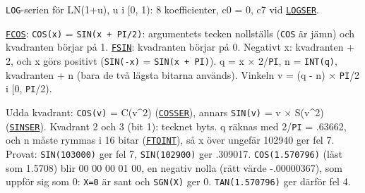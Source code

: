 \begin{Listing}
\Gap
\begin{Cmt}\par\noindent \texttt{LOG}-serien för LN(1+u), u i [0, 1): 8 koefficienter, c0 = 0, c7 vid \hyperlink{l:LOGSER}{\texttt{LOGSER}}.\par\end{Cmt}
\Gap
{}
\begin{Note}\par\noindent \hyperlink{l:FCOS}{\texttt{FCOS}}: \texttt{COS(x)} = \texttt{SIN(x + PI/2)}: argumentets tecken nollställs (\texttt{COS} är jämn) och kvadranten börjar på 1. \hyperlink{l:FSIN}{\texttt{FSIN}}: kvadranten börjar på 0. Negativt x: kvadranten + 2, och x görs positivt (\texttt{SIN(-x)} = \texttt{SIN(x + PI)}). q = {}x{} × 2/\texttt{PI}, n = \texttt{INT(q)}, kvadranten + n (bara de två lägsta bitarna används). Vinkeln v = (q - n) × \texttt{PI}/2 i [0, \texttt{PI}/2).\par
\par\noindent Udda kvadrant: \texttt{COS(v)} = C(v\^{}2) (\hyperlink{l:COSSER}{\texttt{COSSER}}), annars \texttt{SIN(v)} = v × S(v\^{}2) (\hyperlink{l:SINSER}{\texttt{SINSER}}). Kvadrant 2 och 3 (bit 1): tecknet byts. q räknas med 2/\texttt{PI} = .63662, och n måste rymmas i 16 bitar (\hyperlink{l:FTOINT}{\texttt{FTOINT}}), så {}x{} över ungefär 102940 ger fel 7. Provat: \texttt{SIN(103000)} ger fel 7, \texttt{SIN(102900)} ger .309017. \texttt{COS(1.570796)} (läst som 1.5708) blir 00 00 00 01 00, en negativ nolla (rätt värde -.00000367), som uppför sig som 0: \texttt{X=0} är sant och \texttt{SGN(X)} ger 0. \texttt{TAN(1.570796)} ger därför fel 4.\par\end{Note}

\end{Listing}

